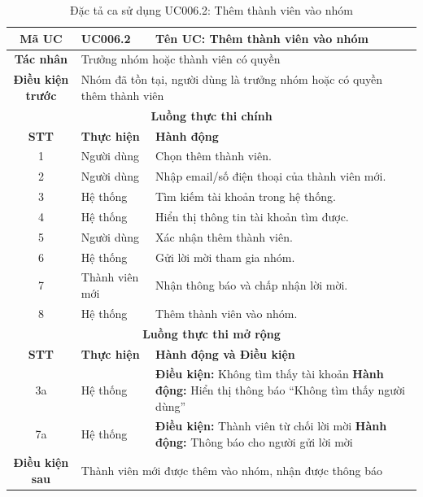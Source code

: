 \begin{table}[H]
    \centering
    \label{tab:uc006-2}
    \begin{tabularx}{\textwidth}{|c|p{3.5cm}|X|}
        \hline
        \rowcolor{headergreen} 
        \textbf{Mã UC} & \textbf{UC006.2} & \textbf{Tên UC: Thêm thành viên vào nhóm} \\ \hline
        \textbf{Tác nhân} & \multicolumn{2}{l|}{Trưởng nhóm hoặc thành viên có quyền} \\ \hline
        \textbf{Điều kiện trước} & \multicolumn{2}{X|}{Nhóm đã tồn tại, người dùng là trưởng nhóm hoặc có quyền thêm thành viên} \\ \hline
        
        \multicolumn{3}{|c|}{\cellcolor{headerorange}\textbf{Luồng thực thi chính}} \\ \hline
        \rowcolor{graybg} \textbf{STT} & \textbf{Thực hiện} & \textbf{Hành động} \\ \hline
        1 & Người dùng & Chọn thêm thành viên. \\ \hline
        2 & Người dùng & Nhập email/số điện thoại của thành viên mới. \\ \hline
        3 & Hệ thống & Tìm kiếm tài khoản trong hệ thống. \\ \hline
        4 & Hệ thống & Hiển thị thông tin tài khoản tìm được. \\ \hline
        5 & Người dùng & Xác nhận thêm thành viên. \\ \hline
        6 & Hệ thống & Gửi lời mời tham gia nhóm. \\ \hline
        7 & Thành viên mới & Nhận thông báo và chấp nhận lời mời. \\ \hline
        8 & Hệ thống & Thêm thành viên vào nhóm. \\ \hline
        
        \multicolumn{3}{|c|}{\cellcolor{headerorange}\textbf{Luồng thực thi mở rộng}} \\ \hline
        \rowcolor{graybg} \textbf{STT} & \textbf{Thực hiện} & \textbf{Hành động và Điều kiện} \\ \hline
        3a & Hệ thống & \textbf{Điều kiện:} Không tìm thấy tài khoản \newline \textbf{Hành động:} Hiển thị thông báo ``Không tìm thấy người dùng'' \\ \hline
        7a & Hệ thống & \textbf{Điều kiện:} Thành viên từ chối lời mời \newline \textbf{Hành động:} Thông báo cho người gửi lời mời \\ \hline
        
        \textbf{Điều kiện sau} & \multicolumn{2}{X|}{Thành viên mới được thêm vào nhóm, nhận được thông báo} \\ \hline
    \end{tabularx}
    \caption{Đặc tả ca sử dụng UC006.2: Thêm thành viên vào nhóm}
\end{table}

